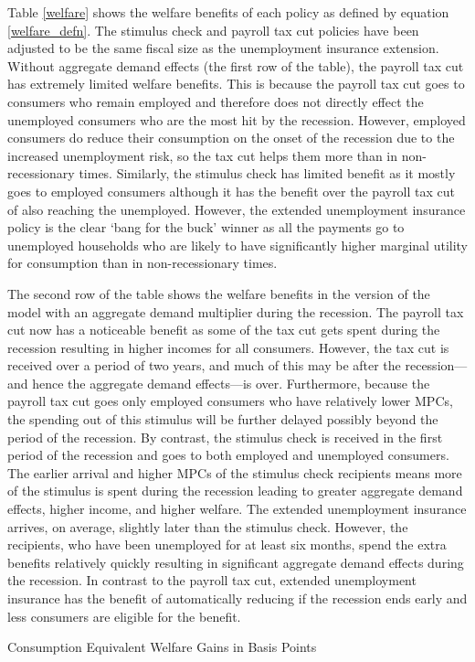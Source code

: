 \documentclass[../HAFiscal]{subfiles}
\begin{document}
Table \ref{welfare} shows the welfare benefits of each policy as defined by equation \ref{welfare_defn}. The stimulus check and payroll tax cut policies have been adjusted to be the same fiscal size as the unemployment insurance extension. Without aggregate demand effects (the first row of the table), the payroll tax cut has extremely limited welfare benefits. This is because the payroll tax cut goes to consumers who remain employed and therefore does not directly effect the unemployed consumers who are the most hit by the recession. However, employed consumers do reduce their consumption on the onset of the recession due to the increased unemployment risk, so the tax cut helps them more than in non-recessionary times.  Similarly, the stimulus check has limited benefit as it mostly goes to employed consumers although it has the benefit over the payroll tax cut of also reaching the unemployed. However, the extended unemployment insurance policy is the clear `bang for the buck' winner as all the payments go to unemployed households who are likely to have significantly higher marginal utility for consumption than in non-recessionary times.

The second row of the table shows the welfare benefits in the version of the model with an aggregate demand multiplier during the recession. The payroll tax cut now has a noticeable benefit as some of the tax cut gets spent during the recession resulting in higher incomes for all consumers. However, the tax cut is received over a period of two years, and much of this may be after the recession---and hence the aggregate demand effects---is over. Furthermore, because the payroll tax cut goes only employed consumers who have relatively lower MPCs, the spending out of this stimulus will be further delayed possibly beyond the period of the recession. By contrast, the stimulus check is received in the first period of the recession and goes to both employed and unemployed consumers. The earlier arrival and higher MPCs of the stimulus check recipients means more of the stimulus is spent during the recession leading to greater aggregate demand effects, higher income, and higher welfare. The extended unemployment insurance arrives, on average, slightly later than the stimulus check. However, the recipients, who have been unemployed for at least six months, spend the extra benefits relatively quickly resulting in significant aggregate demand effects during the recession. In contrast to the payroll tax cut, extended unemployment insurance has the benefit of automatically reducing if the recession ends early and less consumers are eligible for the benefit.

\begin{table}[ht] 
	\center
	
	\caption{Consumption Equivalent Welfare Gains in Basis Points }
	\label{welfare}
\end{table}
\end{document}
